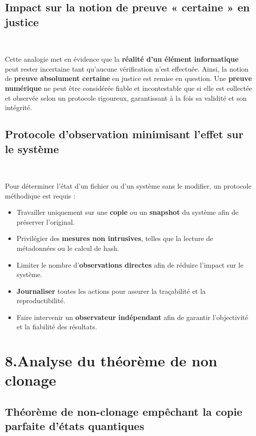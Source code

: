 \documentclass[12pt,a4paper]{report}
\begin{document}
{		\subsection*{Impact sur la notion de preuve « certaine » en justice}\
		
		Cette analogie met en évidence que la \textbf{réalité d’un élément informatique} peut rester incertaine tant qu’aucune vérification n’est effectuée.  
		Ainsi, la notion de \textbf{preuve absolument certaine} en justice est remise en question.  
		Une \textbf{preuve numérique} ne peut être considérée fiable et incontestable que si elle est collectée et observée selon un protocole rigoureux, garantissant à la fois sa validité et son intégrité.
		
		\subsection*{Protocole d’observation minimisant l’effet sur le système}\
		
		Pour déterminer l’état d’un fichier ou d’un système sans le modifier, un protocole méthodique est requis :
		
		\begin{itemize}
			\item Travailler uniquement sur une \textbf{copie} ou un \textbf{snapshot} du système afin de préserver l’original.
			\item Privilégier des \textbf{mesures non intrusives}, telles que la lecture de métadonnées ou le calcul de hash.
			\item Limiter le nombre d’\textbf{observations directes} afin de réduire l’impact sur le système.
			\item \textbf{Journaliser} toutes les actions pour assurer la traçabilité et la reproductibilité.
			\item Faire intervenir un \textbf{observateur indépendant} afin de garantir l’objectivité et la fiabilité des résultats.
		\end{itemize}
		
		\section*{8.Analyse du théorème de non clonage}
		\subsection*{Théorème de non-clonage empêchant la copie parfaite d’états quantiques}\
		
}
\end{document}
